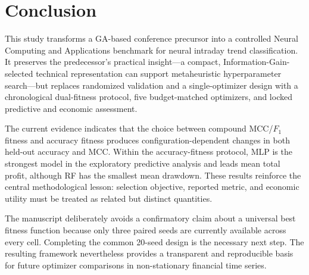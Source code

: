 \section{Conclusion}\label{sec:conclusion}

This study transforms a GA-based conference precursor into a controlled Neural Computing and Applications benchmark for neural intraday trend classification. It preserves the predecessor's practical insight---a compact, Information-Gain-selected technical representation can support metaheuristic hyperparameter search---but replaces randomized validation and a single-optimizer design with a chronological dual-fitness protocol, five budget-matched optimizers, and locked predictive and economic assessment.

The current evidence indicates that the choice between compound MCC/$F_1$ fitness and accuracy fitness produces configuration-dependent changes in both held-out accuracy and MCC. Within the accuracy-fitness protocol, MLP is the strongest model in the exploratory predictive analysis and leads mean total profit, although RF has the smallest mean drawdown. These results reinforce the central methodological lesson: selection objective, reported metric, and economic utility must be treated as related but distinct quantities.

The manuscript deliberately avoids a confirmatory claim about a universal best fitness function because only three paired seeds are currently available across every cell. Completing the common 20-seed design is the necessary next step. The resulting framework nevertheless provides a transparent and reproducible basis for future optimizer comparisons in non-stationary financial time series.
